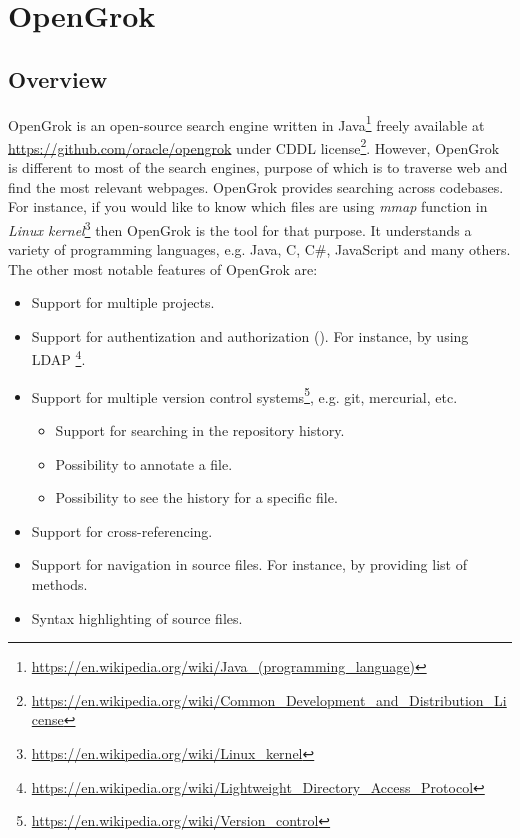 \chapter{OpenGrok}
\label{chap:opengrok}

\section{Overview}
\label{opengrok_overview}
OpenGrok is an open-source search engine written in
Java\footnote{\url{https://en.wikipedia.org/wiki/Java\_(programming\_language)}}
freely available at \url{https://github.com/oracle/opengrok} under CDDL
license\footnote{\url{https://en.wikipedia.org/wiki/Common\_Development\_and\_Distribution\_License}}.
However, OpenGrok is different to most of the search engines, purpose of which is to traverse web and find the most relevant
webpages. OpenGrok provides searching across codebases. For instance, if you would like to know which files are using
\textit{mmap} function in \textit{Linux kernel}\footnote{\url{https://en.wikipedia.org/wiki/Linux\_kernel}} then
OpenGrok is the tool for that purpose. It understands a variety of
programming languages, e.g. Java, C, C\#, JavaScript and many others.
The other most notable features of OpenGrok are:
\begin{itemize}
    \item Support for multiple projects.
    \item Support for authentization and authorization (\cite{OpengrokAuthLayer}). For instance, by using LDAP
        \footnote{\url{https://en.wikipedia.org/wiki/Lightweight_Directory_Access_Protocol}}.
    \item Support for multiple version control systems\footnote{\url{https://en.wikipedia.org/wiki/Version\_control}},
        e.g. git, mercurial, etc.
        \begin{itemize}
            \item Support for searching in the repository history.
            \item Possibility to annotate a file.
            \item Possibility to see the history for a specific file.
        \end{itemize}
    \item Support for cross-referencing.
    \item Support for navigation in source files. For instance, by providing list of methods.
    \item Syntax highlighting of source files.
\end{itemize}

